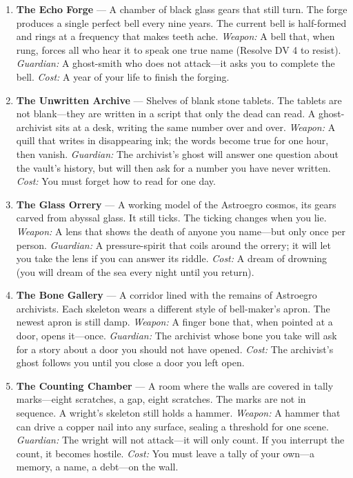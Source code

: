\begin{enumerate}
\item \textbf{The Echo Forge} --- A chamber of black glass gears that still turn. The forge produces a single perfect bell every nine years. The current bell is half-formed and rings at a frequency that makes teeth ache. \emph{Weapon:} A bell that, when rung, forces all who hear it to speak one true name (Resolve DV 4 to resist). \emph{Guardian:} A ghost-smith who does not attack---it asks you to complete the bell. \emph{Cost:} A year of your life to finish the forging.

\item \textbf{The Unwritten Archive} --- Shelves of blank stone tablets. The tablets are not blank---they are written in a script that only the dead can read. A ghost-archivist sits at a desk, writing the same number over and over. \emph{Weapon:} A quill that writes in disappearing ink; the words become true for one hour, then vanish. \emph{Guardian:} The archivist's ghost will answer one question about the vault's history, but will then ask for a number you have never written. \emph{Cost:} You must forget how to read for one day.

\item \textbf{The Glass Orrery} --- A working model of the Astroegro cosmos, its gears carved from abyssal glass. It still ticks. The ticking changes when you lie. \emph{Weapon:} A lens that shows the death of anyone you name---but only once per person. \emph{Guardian:} A pressure-spirit that coils around the orrery; it will let you take the lens if you can answer its riddle. \emph{Cost:} A dream of drowning (you will dream of the sea every night until you return).

\item \textbf{The Bone Gallery} --- A corridor lined with the remains of Astroegro archivists. Each skeleton wears a different style of bell-maker's apron. The newest apron is still damp. \emph{Weapon:} A finger bone that, when pointed at a door, opens it---once. \emph{Guardian:} The archivist whose bone you take will ask for a story about a door you should not have opened. \emph{Cost:} The archivist's ghost follows you until you close a door you left open.

\item \textbf{The Counting Chamber} --- A room where the walls are covered in tally marks---eight scratches, a gap, eight scratches. The marks are not in sequence. A wright's skeleton still holds a hammer. \emph{Weapon:} A hammer that can drive a copper nail into any surface, sealing a threshold for one scene. \emph{Guardian:} The wright will not attack---it will only count. If you interrupt the count, it becomes hostile. \emph{Cost:} You must leave a tally of your own---a memory, a name, a debt---on the wall.


\end{enumerate}
